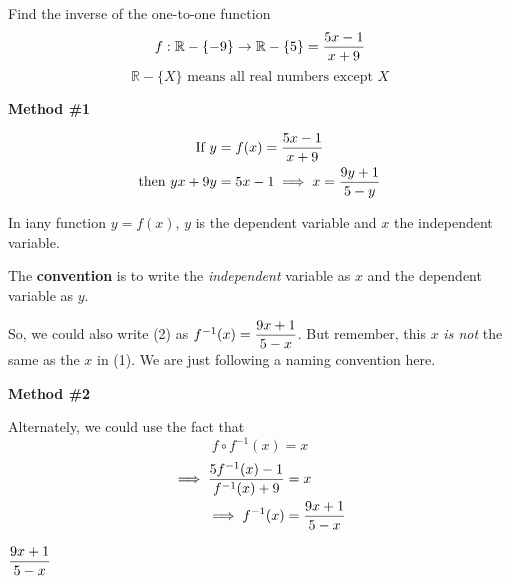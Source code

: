 


\question[2] Find the inverse of the one-to-one function
\[ f:\mathbb{R}-\{-9\}\to \mathbb{R}-\{5\} =\dfrac{5 x-1}{x+9 }\]
\[\mathbb{R}-\lbrace X\rbrace\text{ means all real numbers except } X \]

\watchout

\begin{solution}[\mcq]
  \textbf{Method \#1}

	\begin{align}
		\text{If } y &= f(x) = \dfrac{5 x-1}{x+9} \\
		\text{then } yx + 9 y &= 5 x - 1 \implies x = \dfrac{9 y + 1}{5 - y} 
	\end{align}

	In iany function $y = f(x)$, $y$ is the dependent variable and $x$ the independent variable. 
	
  The \textbf{convention} is to write the \textit{independent} variable as $x$ and the 
	dependent variable as $y$.
	
	So, we could also write (2) as $f^{-1}(x) = \dfrac{9 x+1}{5-x}$. But remember, this $x$ 
	\textit{is not} the same as the $x$ in (1). We are just following a naming
	convention here.
	
  \textbf{Method \#2}

	Alternately, we could use the fact that 
  \[ f \circ f^{-1}(x) = x \]
	\begin{align}
		\implies \dfrac{5 f^{-1}(x)-1}{f^{-1}(x)+9} &= x \\
		\implies f^{-1}(x) &= \dfrac{9 x + 1}{5 - x }
	\end{align}
\end{solution}

\ifprintanswers
  \begin{codex}
    $\dfrac{9 x + 1}{5 -x}$
  \end{codex}
\fi 


